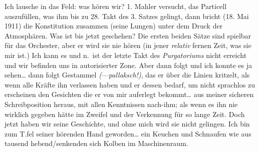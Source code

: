 \documentclass[
]{article}
\begin{document}
Ich lausche in das Feld: was hören wir? 1. Mahler versucht, das
Particell auszufüllen, was ihm bis zu 28. Takt des 3. Satzes gelingt,
dann bricht (18. Mai 1911) die Konstitution zusammen (seine Lungen)
unter dem Druck der Atmosphären. Was ist bis jetzt geschehen? Die ersten
beiden Sätze sind spielbar für das Orchester, aber er wird sie nie hören
(in jener \emph{relativ} fernen Zeit, was sie mir ist.) Ich kann es und
n.~ist der letzte Takt des \emph{Purgatoriums} nicht erreicht und wir
befinden uns in autorisierter Zone. Aber dann folgt und ich konnte es ja
sehen\ldots{} dann folgt Gestammel \emph{(}---\emph{pallaksch!)}, das er
über die Linien kritzelt, als wenn alle Kräfte ihn verlassen haben und
er dessen bedarf, um nicht sprachlos zu erscheinen den Gesichten die er
von mir auferlegt bekommt\ldots{} aus meiner sicheren Schreibposition
heraus, mit allen Kenntnissen nach-ihm; als wenn es ihn nie wirklich
gegeben hätte im Zweifel und der Verkennung für so lange Zeit. Doch
jetzt haben wir seine Geschichte, und ohne mich wird sie nicht gelingen.
Ich bin zum T.fel seiner hörenden Hand geworden\ldots{} ein Keuchen und
Schnaufen wie aus tausend hebend/senkenden sich Kolben im Maschinenraum.
\end{document}
